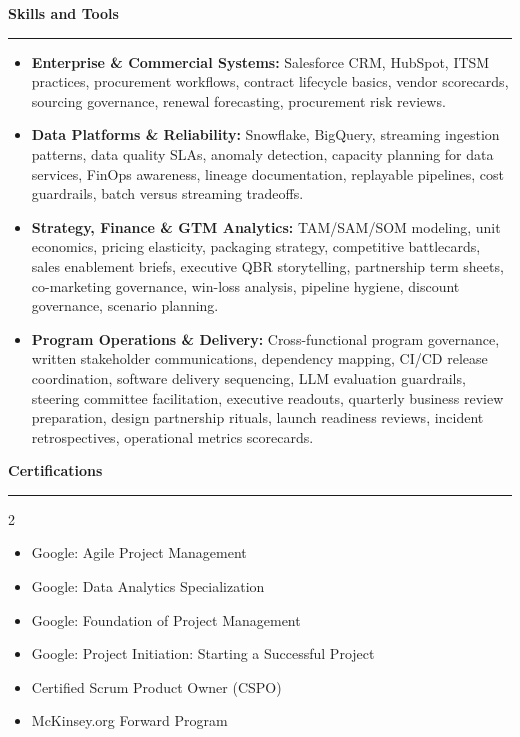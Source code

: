 \documentclass[9pt,letterpaper]{article} %
\newenvironment{rSection}[1]{ %
  \sectionskip
 \textbf{\Large #1} %
  \sectionlineskip
  \hrule %
  \begin{list}{}{ %
    \setlength{\leftmargin}{-0em} %
  }
  \item[]
}{
  \end{list}
}
\def\sectionlineskip{\smallskip} %
\def\sectionskip{} %
\begin{document}
\begin{rSection}{Skills and Tools}
\begin{itemize}[left=-1.5em, labelsep=.1cm, labelwidth=.2cm, itemsep=0.0em, topsep=0pt]
\item \textbf{Enterprise \& Commercial Systems:} Salesforce CRM, HubSpot, ITSM practices, procurement workflows, contract lifecycle basics, vendor scorecards, sourcing governance, renewal forecasting, procurement risk reviews.
\item \textbf{Data Platforms \& Reliability:} Snowflake, BigQuery, streaming ingestion patterns, data quality SLAs, anomaly detection, capacity planning for data services, FinOps awareness, lineage documentation, replayable pipelines, cost guardrails, batch versus streaming tradeoffs.
\item \textbf{Strategy, Finance \& GTM Analytics:} TAM/SAM/SOM modeling, unit economics, pricing elasticity, packaging strategy, competitive battlecards, sales enablement briefs, executive QBR storytelling, partnership term sheets, co-marketing governance, win-loss analysis, pipeline hygiene, discount governance, scenario planning.
\item \textbf{Program Operations \& Delivery:} Cross-functional program governance, written stakeholder communications, dependency mapping, CI/CD release coordination, software delivery sequencing, LLM evaluation guardrails, steering committee facilitation, executive readouts, quarterly business review preparation, design partnership rituals, launch readiness reviews, incident retrospectives, operational metrics scorecards.
\end{itemize}
\end{rSection}%
\begin{rSection}{Certifications}
\begin{multicols}{2}
\begin{itemize}[left=-1.5em, labelsep=.1cm, labelwidth=.2cm, itemsep=0.0em, topsep=0pt]
\item Google: Agile Project Management
\item Google: Data Analytics Specialization
\item Google: Foundation of Project Management
\item Google: Project Initiation: Starting a Successful Project
\item Certified Scrum Product Owner (CSPO)
\item McKinsey.org Forward Program
\end{itemize}
\end{multicols}
\end{rSection}
\end{document}
